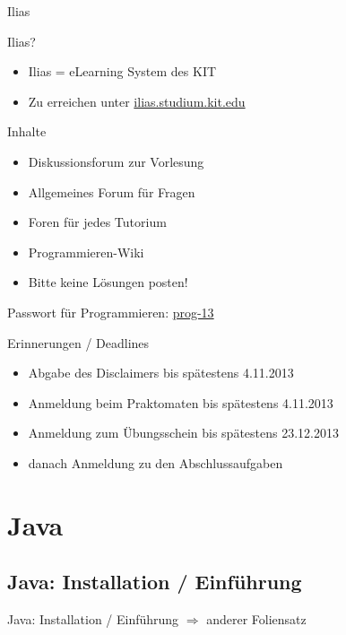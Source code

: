 \documentclass[18pt]{beamer}
\begin{document}
\begin{frame}{Ilias}
	\begin{block}{Ilias?}
	\begin{itemize}
		\item Ilias = eLearning System des KIT
		\item Zu erreichen unter \url{ilias.studium.kit.edu}
	\end{itemize}
	\end{block}
	\pause
	\begin{block}{Inhalte}
	\begin{itemize}
		\item Diskussionsforum zur Vorlesung
		\item Allgemeines Forum für Fragen
		\item Foren für jedes Tutorium
		\item Programmieren-Wiki
		\item \textcolor[rgb]{1,0,0}{Bitte keine Lösungen posten!}
	\end{itemize}
	\end{block}
	Passwort für Programmieren: \hspace{1cm} \url{prog-13}
\end{frame}

\begin{frame}{Erinnerungen / Deadlines}
	\begin{itemize}
		\item Abgabe des Disclaimers bis spätestens 4.11.2013
		\item Anmeldung beim Praktomaten bis spätestens 4.11.2013
		\item Anmeldung zum Übungsschein bis spätestens 23.12.2013	
		\item danach Anmeldung zu den Abschlussaufgaben
	\end{itemize}		
\end{frame}

\section{Java}
\subsection{Java: Installation / Einführung}
\begin{frame}{Java: Installation / Einführung}
	$\Rightarrow$ anderer Foliensatz
\end{frame}
\end{document}
